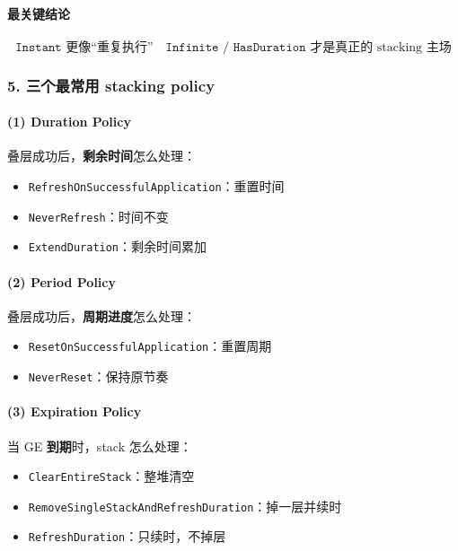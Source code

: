 \documentclass[CJKmath=true,10pt]{MyBook}
\begin{document}
\paragraph{最关键结论}
\[
\boxed{
	\texttt{Instant} \text{ 更像“重复执行”}
	\quad
	\texttt{Infinite / HasDuration} \text{ 才是真正的 stacking 主场}
}
\]

\subsubsection{5. 三个最常用 stacking policy}

\paragraph{(1) Duration Policy}
叠层成功后，\textbf{剩余时间}怎么处理：

\begin{itemize}
	\item \texttt{RefreshOnSuccessfulApplication}：重置时间
	\item \texttt{NeverRefresh}：时间不变
	\item \texttt{ExtendDuration}：剩余时间累加
\end{itemize}

\paragraph{(2) Period Policy}
叠层成功后，\textbf{周期进度}怎么处理：

\begin{itemize}
	\item \texttt{ResetOnSuccessfulApplication}：重置周期
	\item \texttt{NeverReset}：保持原节奏
\end{itemize}

\paragraph{(3) Expiration Policy}
当 GE \textbf{到期}时，stack 怎么处理：

\begin{itemize}
	\item \texttt{ClearEntireStack}：整堆清空
	\item \texttt{RemoveSingleStackAndRefreshDuration}：掉一层并续时
	\item \texttt{RefreshDuration}：只续时，不掉层
\end{itemize}
\end{document}
